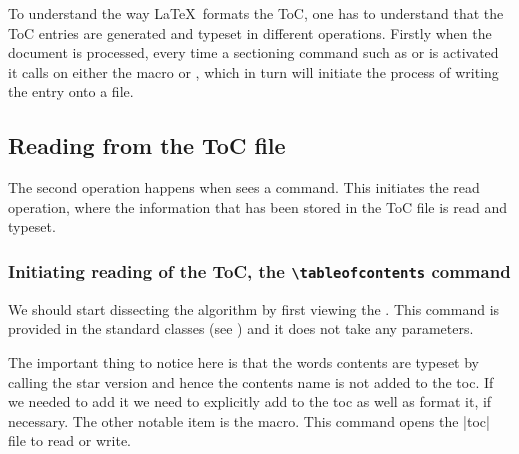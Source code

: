 \begin{macro}{\addcontentsline}
\begin{macro}{\addcontents}
To understand the way \LaTeX\ formats the ToC, one has to understand that the ToC entries are generated and typeset in different operations. Firstly when the document is processed, every time a sectioning command such as  or  is activated it calls on either the macro  or , which in turn will initiate the process of writing the entry onto a file.
\end{macro}
\end{macro}


\subsection{Reading from the ToC file}

\begin{macro}{\tableofcontents}
The second operation happens when \latexe sees a  command. This initiates the read operation, where the information that has been stored in the ToC file is read and typeset.
\end{macro}


\subsubsection{Initiating reading of the ToC, the \texttt{\textbackslash tableofcontents} command}

We should start dissecting the algorithm by first viewing the . This command is provided in
the standard classes (see \pageref{tableofcontents}) and it does not take any parameters.

\begin{teX}
\setcounter{tocdepth}{2}
\newcommand\tableofcontents{%
    \if@twocolumn
      \@restonecoltrue\onecolumn
    \else
      \@restonecolfalse
    \fi
    \chapter*{\contentsname
        \@mkboth{%
           \MakeUppercase\contentsname}{\MakeUppercase\contentsname}}%
          \@starttoc{toc} (*@\label{starttoc}@*)
    \if@restonecol\twocolumn\fi
    }
\end{teX}


The important thing to notice here is that the words contents are typeset by calling the star version and hence the contents name is not added to the toc. If we needed to add it we need to explicitly add to the toc as well as format it, if necessary. The other notable item is the  macro. This command opens the |toc| file to read or write.

